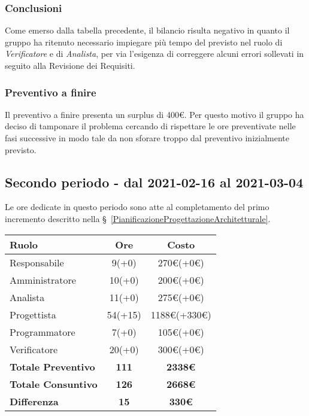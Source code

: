 {{{\subsubsection{Conclusioni}
Come emerso dalla tabella precedente, il bilancio risulta negativo in quanto il gruppo ha ritenuto necessario impiegare più tempo del previsto nel ruolo di \textit{Verificatore} e di \textit{Analista}, per via l'esigenza di correggere alcuni errori sollevati in seguito alla Revisione dei Requisiti. 

\subsubsection{Preventivo a finire}
Il preventivo a finire presenta un surplus di 400\euro. Per questo motivo il gruppo ha deciso di tamponare il problema cercando di rispettare le ore preventivate nelle fasi successive in modo tale da non sforare troppo dal preventivo inizialmente previsto.

\subsection{Secondo periodo - dal 2021-02-16 al 2021-03-04 }\label{ConsuntivoPeriodoDiProgettazioneArchitetturaleTechnologyBaselinePrimoIncremento}

Le ore dedicate in questo periodo sono atte al completamento del primo incremento descritto nella  \S~\ref{PianificazioneProgettazioneArchitetturale}.

\quad
\def\tabularxcolumn#1{m{#1}}
{
	\begin{center}
		\renewcommand{\arraystretch}{1.4}
		\begin{tabularx}{10cm}{|X|c|c|}
			\hline
			\rowcolor{airforceblue}
			\textbf{Ruolo} & \textbf{Ore} & \textbf{Costo}\\
			\hline
			Responsabile & 9(+0) & 270\euro(+0\euro)\\
			\hline
			Amministratore & 10(+0) & 200\euro(+0\euro)\\
			\hline
			Analista & 11(+0) & 275\euro(+0\euro)\\
			\hline
			Progettista & 54(+15) & 1188\euro(+330\euro)\\
			\hline
			Programmatore & 7(+0) & 105\euro(+0\euro)\\
			\hline
			Verificatore & 20(+0) & 300\euro(+0\euro)\\
			\hline
			\textbf{Totale Preventivo} & \textbf{111} & \textbf{2338\euro}\\
			\hline
			\textbf{Totale Consuntivo} & \textbf{126} & \textbf{2668\euro}\\
			\hline
			\textbf{Differenza} & \textbf{15} & \textbf{330\euro}
		\end{tabularx}
	\end{center}

}}}}
